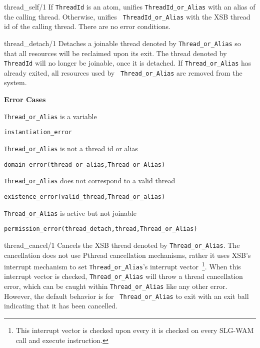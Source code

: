 \begin{description}
{thread\_self/1}
%
If {\tt ThreadId} is an atom, unifies {\tt ThreadId\_or\_Alias} with
an alias of the calling thread.  Otherwise, unifies {\tt
  ThreadId\_or\_Alias} with the XSB thread id of the calling thread.
There are no error conditions.


{thread\_detach/1}
%
Detaches a joinable thread denoted by {\tt Thread\_or\_Alias} so that
all resources will be reclaimed upon its exit.  The thread denoted by
{\tt ThreadId} will no longer be joinable, once it is detached.  If
{\tt Thread\_or\_Alias} has already exited, all resources used by {\tt
  Thread\_or\_Alias} are removed from the system.


{\bf Error Cases}
\bi
%
\item 	{\tt Thread\_or\_Alias} is a variable
\bi
\item 	{\tt instantiation\_error}
\ei
%
\item 	{\tt Thread\_or\_Alias} is not a thread id or alias
\bi
\item 	{\tt domain\_error(thread\_or\_alias,Thread\_or\_Alias)}
\ei
%
\item   {\tt Thread\_or\_Alias} does not correspond to a valid thread
\bi
\item   {\tt existence\_error(valid\_thread,Thread\_or\_alias)}
\ei
%
\item 	{\tt Thread\_or\_Alias} is active but not joinable
\bi
\item 	{\tt permission\_error(thread\_detach,thread,Thread\_or\_Alias)}
\ei
\ei

{thread\_cancel/1}
%
Cancels the XSB thread denoted by {\tt Thread\_or\_Alias}.  The cancellation
does not use Pthread cancellation mechanisms, rather it uses XSB's
interrupt mechanism to set {\tt Thread\_or\_Alias}'s interrupt
vector~\footnote{This interrupt vector is checked upon every it is
  checked on every SLG-WAM {\sf call} and {\sf execute} instruction.}.
When this interrupt vector is checked, {\tt Thread\_or\_Alias} will throw a
thread cancellation error, which can be caught within {\tt Thread\_or\_Alias}
like any other error.  However, the default behavior is for {\tt
  Thread\_or\_Alias} to exit with an exit ball indicating that it has been
cancelled.  


\end{description}
